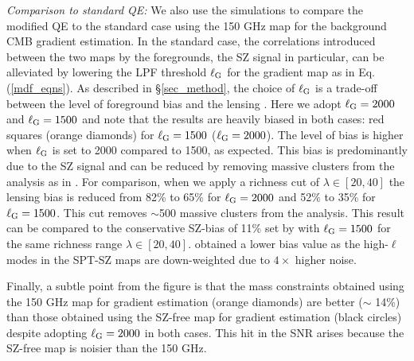 {\it Comparison to standard QE:} We also use the \cite{sehgal10} simulations to compare the modified QE to the standard case using the 150 GHz map for the background CMB gradient estimation.
In the standard case, the correlations introduced between the two maps by the foregrounds, the SZ signal in particular, can be alleviated by lowering the LPF threshold $\ell_{\rm G}$ for the gradient map as in Eq. (\ref{mdf_eqns}). 
As described in \S\ref{sec_method}, the choice of $\ell_{\rm G}$ is a trade-off between the level of foreground bias and the lensing \snr{}. 
Here we adopt $\ell_{\rm G} = 2000$ and $\ell_{\rm G} = 1500$ and note that the results are heavily biased in both cases: red squares (orange diamonds) for $\ell_{\rm G} = 1500$ ($\ell_{\rm G} = 2000$).
The level of bias is higher when $\ell_{\rm G}$ is set to 2000 compared to 1500, as expected.
This bias is predominantly due to the SZ signal and can be reduced by removing massive clusters from the analysis as in \cite{baxter18}. 
For comparison, when we apply a richness cut of $\lambda \in [20, 40]$ the lensing bias is reduced from 82\% to 65\% for $\ell_{\rm G} = 2000$ and 52\% to 35\% for $\ell_{\rm G} = 1500$. 
This cut removes $\sim$500 massive clusters from the analysis.
This result can be compared to the conservative SZ-bias of 11\% set by \cite{baxter18} with $\ell_{\rm G} = 1500$ for the same richness range $\lambda \in [20, 40]$.
\cite{baxter18} obtained a lower bias value as the high-$\ell$ modes in the SPT-SZ maps are down-weighted due to $4\times$ higher noise.

Finally, a subtle point from the figure is that the mass constraints obtained using the 150 GHz map for gradient estimation
(orange diamonds) are better ($\sim$ 14\%) than those obtained using the SZ-free map for gradient estimation (black circles) despite adopting $\ell_{\rm G} = 2000$ in both cases.
This hit in the SNR arises because the SZ-free map is noisier than the 150 GHz.
